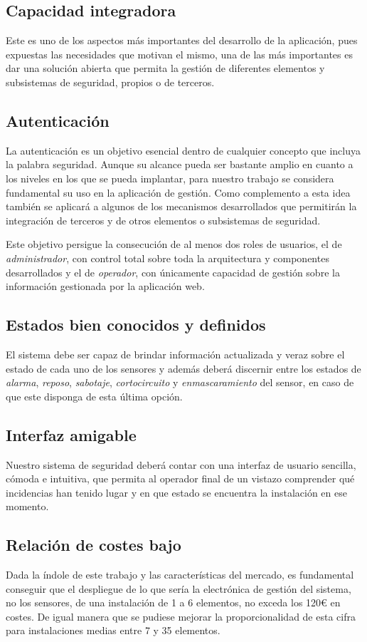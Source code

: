 \subsection{Capacidad integradora}
Este es uno de los aspectos más importantes del desarrollo de la aplicación, pues expuestas las necesidades que motivan el mismo, una de las más importantes es dar una solución abierta que permita la gestión de diferentes elementos y subsistemas de seguridad, propios o de terceros.

\subsection{Autenticación}
La autenticación es un objetivo esencial  dentro de cualquier concepto que incluya
la palabra seguridad. Aunque su alcance pueda ser bastante amplio en cuanto a 
los niveles en los que se pueda implantar, para nuestro trabajo se considera fundamental su uso en la  aplicación de gestión. Como complemento a esta idea también se aplicará a algunos de los mecanismos desarrollados que  permitirán la  integración de terceros y de otros
elementos o  subsistemas de  seguridad. 

Este objetivo persigue la consecución de al menos dos roles de usuarios, el de \textit{administrador}, con control total sobre toda la arquitectura y componentes desarrollados y el de \textit{operador}, con únicamente capacidad de gestión sobre la información gestionada por la aplicación web.

\subsection{Estados bien conocidos y definidos}
El sistema debe ser capaz de brindar información actualizada y veraz sobre el estado de cada uno de los sensores y además deberá discernir entre los estados de \textit{alarma}, \textit{reposo}, \textit{sabotaje}, \textit{cortocircuito} y \textit{enmascaramiento} del sensor, en caso de que este disponga de esta última opción.

\subsection{Interfaz amigable}
Nuestro sistema de seguridad deberá contar con una interfaz de usuario
sencilla,  cómoda e  intuitiva, que  permita  al operador  final de  un
vistazo comprender qué incidencias han tenido lugar y en que estado se
encuentra la instalación en ese  momento.

\subsection{Relación de costes bajo}
Dada la índole de este trabajo y las características del mercado, es fundamental conseguir que el despliegue de lo que sería la electrónica
de gestión del sistema, no los sensores, de una instalación de 1 a 6 elementos, no exceda los 120\euro{} en costes. De igual manera que se pudiese mejorar la proporcionalidad de esta cifra para instalaciones medias entre 7 y 35 elementos.